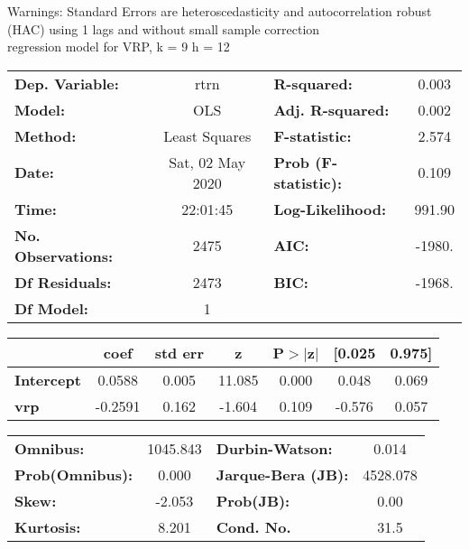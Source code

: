 Warnings: \newline
 [1] Standard Errors are heteroscedasticity and autocorrelation robust (HAC) using 1 lags and without small sample correction\\ 

regression model for VRP, k = 9 h = 12\begin{center}
\begin{tabular}{lclc}
\toprule
\textbf{Dep. Variable:}    &       rtrn       & \textbf{  R-squared:         } &     0.003   \\
\textbf{Model:}            &       OLS        & \textbf{  Adj. R-squared:    } &     0.002   \\
\textbf{Method:}           &  Least Squares   & \textbf{  F-statistic:       } &     2.574   \\
\textbf{Date:}             & Sat, 02 May 2020 & \textbf{  Prob (F-statistic):} &    0.109    \\
\textbf{Time:}             &     22:01:45     & \textbf{  Log-Likelihood:    } &    991.90   \\
\textbf{No. Observations:} &        2475      & \textbf{  AIC:               } &    -1980.   \\
\textbf{Df Residuals:}     &        2473      & \textbf{  BIC:               } &    -1968.   \\
\textbf{Df Model:}         &           1      & \textbf{                     } &             \\
\bottomrule
\end{tabular}
\begin{tabular}{lcccccc}
                   & \textbf{coef} & \textbf{std err} & \textbf{z} & \textbf{P$> |$z$|$} & \textbf{[0.025} & \textbf{0.975]}  \\
\midrule
\textbf{Intercept} &       0.0588  &        0.005     &    11.085  &         0.000        &        0.048    &        0.069     \\
\textbf{vrp}       &      -0.2591  &        0.162     &    -1.604  &         0.109        &       -0.576    &        0.057     \\
\bottomrule
\end{tabular}
\begin{tabular}{lclc}
\textbf{Omnibus:}       & 1045.843 & \textbf{  Durbin-Watson:     } &    0.014  \\
\textbf{Prob(Omnibus):} &   0.000  & \textbf{  Jarque-Bera (JB):  } & 4528.078  \\
\textbf{Skew:}          &  -2.053  & \textbf{  Prob(JB):          } &     0.00  \\
\textbf{Kurtosis:}      &   8.201  & \textbf{  Cond. No.          } &     31.5  \\
\bottomrule
\end{tabular}
\end{center}

